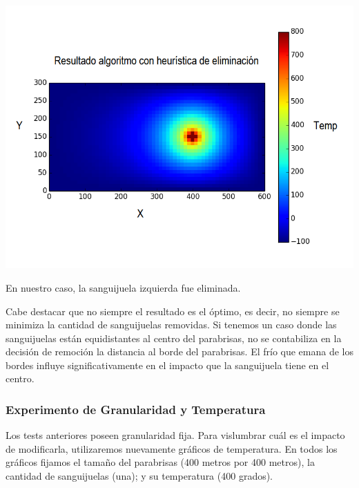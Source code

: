 	\begin{center}
		\includegraphics[scale=0.5]{./img/test6_conkill.png}
	\end{center}

	En nuestro caso, la sanguijuela izquierda fue eliminada.

	Cabe destacar que no siempre el resultado es el óptimo, es decir, no siempre se minimiza la cantidad de sanguijuelas removidas. Si tenemos un caso donde las sanguijuelas están equidistantes al centro del parabrisas, no se contabiliza en la decisión de remoción la distancia al borde del parabrisas. El frío que emana de los bordes influye significativamente en el impacto que la sanguijuela tiene en el centro.

\subsubsection{Experimento de Granularidad y Temperatura}

	Los tests anteriores poseen granularidad fija. Para vislumbrar cuál es el impacto de modificarla, utilizaremos nuevamente gráficos de temperatura. En todos los gráficos fijamos el tamaño del parabrisas (400 metros por 400 metros), la cantidad de sanguijuelas (una); y su temperatura (400 grados).

